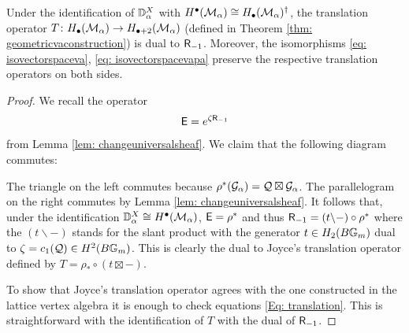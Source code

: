 \documentclass[a4paper, 12pt]{amsart}
\begin{document}
\begin{lemma}\label{lem: translationdualr-1}
Under the identification of ${\mathbb{D}}^X_\alpha$ with $H^\bullet({\mathcal M}_\alpha)\cong H_\bullet({\mathcal M}_\alpha) ^\dagger$, the translation operator $T\colon H_\bullet({\mathcal M}_\alpha)\to H_{\bullet+2}({\mathcal M}_\alpha)$ (defined in Theorem \ref{thm: geometricvaconstruction}) is dual to $\mathsf{R}_{-1}$. Moreover, the isomorphisms \eqref{eq: isovectorspaceva}, \eqref{eq: isovectorspacevapa} preserve the respective translation operators on both sides.
\end{lemma}
\begin{proof}
We recall the operator 
\[{\mathsf{E}}=e^{\zeta \mathsf{R}_{-1}}\] from Lemma \ref{lem: changeuniversalsheaf}. We claim that the following diagram commutes:
\begin{center}
\end{center}
The triangle on the left commutes because $\rho^*({\mathcal G}_\alpha) = {\mathcal Q}\boxtimes {\mathcal G}_\alpha$. The parallelogram on the right commutes by Lemma \ref{lem: changeuniversalsheaf}. It follows that, under the identification ${\mathbb{D}}^X_\alpha\cong H^\bullet({\mathcal M}_\alpha)$, ${\mathsf{E}}=\rho^\ast$ and thus $\mathsf{R}_{-1}=(t\backslash-)\circ \rho^\ast$ where the $(t\backslash -)$ stands for the slant product with the generator $t\in H_2(B{\mathbb{G}}_m)$ dual to $\zeta=c_1({\mathcal Q})\in H^2(B{\mathbb{G}}_m)$. This is clearly the dual to Joyce's translation operator defined by $T=\rho_\ast\circ (t\boxtimes -).$

To show that Joyce's translation operator agrees with the one constructed in the lattice vertex algebra it is enough to check equations \eqref{Eq: translation}. This is straightforward with the identification of $T$ with the dual of $\mathsf{R}_{-1}$. 
\end{proof}
\end{document}
